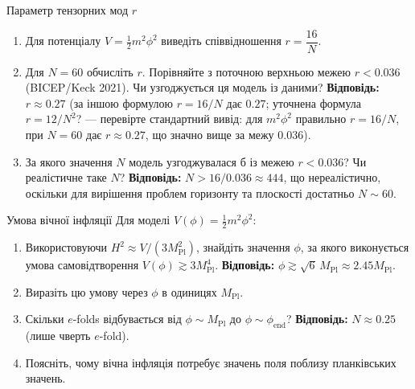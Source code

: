 
\begin{problem}{Параметр тензорних мод $r$}
\begin{enumerate}
    \item Для потенціалу $V = \frac{1}{2}m^2\phi^2$ виведіть співвідношення
          $r = \dfrac{16}{N}$.
    \item Для $N = 60$ обчисліть $r$. Порівняйте з поточною верхньою межею
          $r < 0.036$ (BICEP/Keck 2021). Чи узгоджується ця модель із даними?
          \textbf{Відповідь:} $r \approx 0.27$ (за іншою формулою $r=16/N$ дає $0.27$;
          уточнена формула $r = 12/N^2$? --- перевірте стандартний вивід:
          для $m^2\phi^2$ правильно $r = 16/N$, при $N=60$ дає $r \approx 0.27$,
          що значно вище за межу $0.036$).
    \item За якого значення $N$ модель узгоджувалася б із межею $r < 0.036$?
          Чи реалістичне таке $N$?
          \textbf{Відповідь:} $N > 16/0.036 \approx 444$, що нереалістично,
          оскільки для вирішення проблем горизонту та плоскості достатньо
          $N \sim 60$.
\end{enumerate}
\end{problem}


\begin{problem}{Умова вічної інфляції}
Для моделі $V(\phi) = \frac{1}{2}m^2\phi^2$:

\begin{enumerate}
    \item Використовуючи $H^2 \approx V/(3M_{\text{Pl}}^2)$, знайдіть значення $\phi$, за якого
          виконується умова самовідтворення $V(\phi) \gtrsim 3M_{\text{Pl}}^4$.
          \textbf{Відповідь:} $\phi \gtrsim \sqrt{6}\,M_{\text{Pl}} \approx 2.45 M_{\text{Pl}}$.
    \item Виразіть цю умову через $\phi$ в одиницях $M_{\text{Pl}}$.
    \item Скільки $e$-folds відбувається від $\phi \sim M_{\text{Pl}}$ до $\phi \sim \phi_{\text{end}}$?
          \textbf{Відповідь:} $N \approx 0.25$ (лише чверть $e$-fold).
    \item Поясніть, чому вічна інфляція потребує значень поля поблизу планківських значень.
\end{enumerate}
\end{problem}

